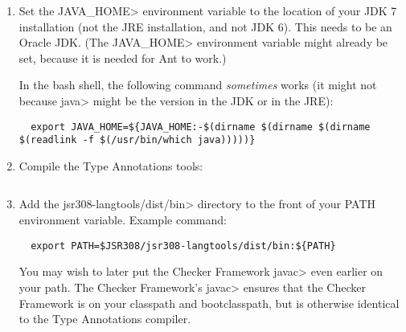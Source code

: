 \begin{enumerate}
\item
Set the \<JAVA\_HOME> environment variable to the location of your JDK 
7 installation (not the JRE installation, and not JDK 6).
This needs to be an Oracle JDK.
(The \<JAVA\_HOME> environment
variable might already be set, because it is needed for Ant to work.)

In the bash shell, the following command \emph{sometimes} works (it might
not because \<java> might be the version in the JDK or in the JRE):
\begin{Verbatim}
  export JAVA_HOME=${JAVA_HOME:-$(dirname $(dirname $(dirname $(readlink -f $(/usr/bin/which java)))))}
\end{Verbatim}


\item
Compile the Type Annotations tools:

\begin{Verbatim}
\end{Verbatim}

\item
 Add the \<jsr308-langtools/dist/bin> directory to the front of your PATH environment variable.
  Example command:

\begin{Verbatim}
  export PATH=$JSR308/jsr308-langtools/dist/bin:${PATH}
\end{Verbatim}

You may wish to later put the Checker Framework \<javac> even earlier on
your path.  The Checker Framework's \<javac> ensures that the Checker
Framework is on your classpath and bootclasspath, but is otherwise
identical to the Type Annotations compiler.

\end{enumerate}




